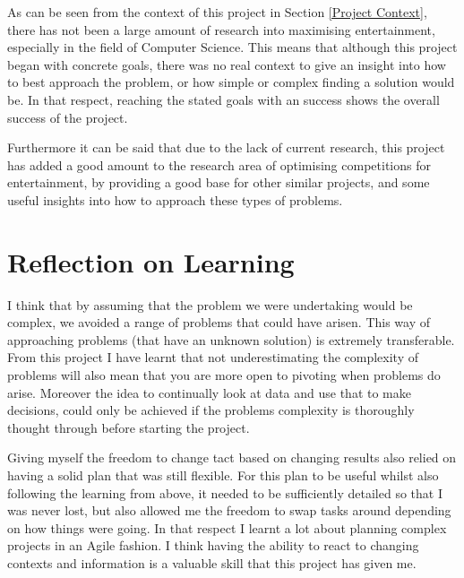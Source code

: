 \documentclass[12pt]{report}
\begin{document}
As can be seen from the context of this project in Section \ref{Project Context}, there has not been a large amount of research into maximising entertainment, especially in the field of Computer Science. This means that although this project began with concrete goals, there was no real context to give an insight into how to best approach the problem, or how simple or complex finding a solution would be. In that respect, reaching the stated goals with an success shows the overall success of the project. 

Furthermore it can be said that due to the lack of current research, this project has added a good amount to the research area of optimising competitions for entertainment, by providing a good base for other similar projects, and some useful insights into how to approach these types of problems.

\section{Reflection on Learning}\label{Reflection}

I think that by assuming that the problem we were undertaking would be complex, we avoided a range of problems that could have arisen. This way of approaching problems (that have an unknown solution) is extremely transferable. From this project I have learnt that not underestimating the complexity of problems will also mean that you are more open to pivoting when problems do arise. Moreover the idea to continually look at data and use that to make decisions, could only be achieved if the problems complexity is thoroughly thought through before starting the project.

Giving myself the freedom to change tact based on changing results also relied on having a solid plan that was still flexible. For this plan to be useful whilst also following the learning from above, it needed to be sufficiently detailed so that I was never lost, but also allowed me the freedom to swap tasks around depending on how things were going. In that respect I learnt a lot about planning complex projects in an Agile fashion. I think having the ability to react to changing contexts and information is a valuable skill that this project has given me.
\end{document}
